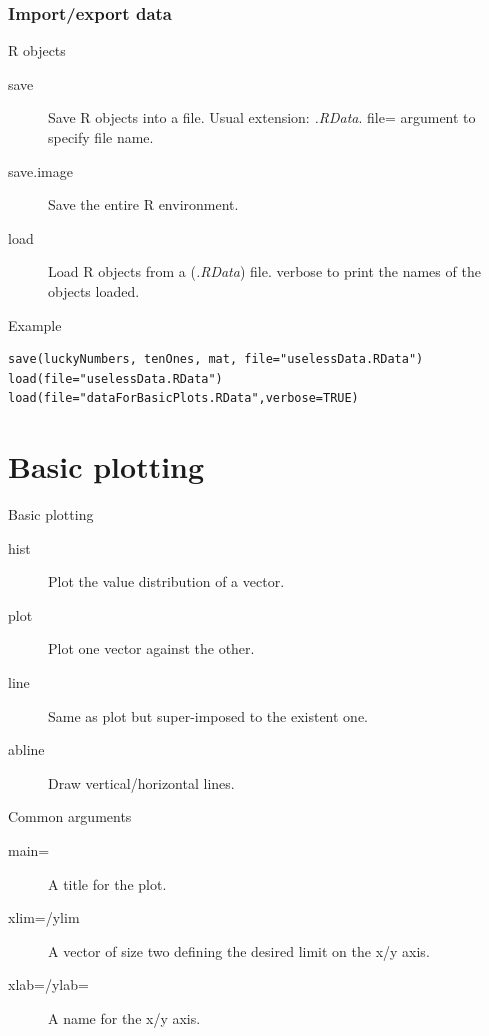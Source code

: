 \documentclass[10pt]{beamer}
\newenvironment{xframe}[2][]
  {\begin{frame}[fragile,environment=xframe,#1]
  \frametitle{#2}}
  {\end{frame}}
\begin{document}
\begin{xframe}{Import/export data}
  \begin{block}{R objects}
    \begin{description}
      \item[save] Save R objects into a file. Usual extension: {\it .RData}. {\sf file=} argument to specify file name.
      \item[save.image] Save the entire R environment.
      \item[load] Load R objects from a ({\it .RData}) file. {\sf verbose} to print the names of the objects loaded.
    \end{description}
  \end{block}
  \begin{exampleblock}{Example}
\begin{verbatim}
save(luckyNumbers, tenOnes, mat, file="uselessData.RData")
load(file="uselessData.RData")
load(file="dataForBasicPlots.RData",verbose=TRUE)
\end{verbatim}  
  \end{exampleblock}
\end{xframe}

\section{Basic plotting}

\begin{frame}{Basic plotting}
  \begin{block}{}
    \begin{description}
      \item[hist] Plot the value distribution of a vector.
      \item[plot] Plot one vector against the other.
      \item[line] Same as plot but super-imposed to the existent one.
      \item[abline] Draw vertical/horizontal lines.
    \end{description}
  \end{block}
  \begin{block}{Common arguments}
    \begin{description}
      \item[main=] A title for the plot.
      \item[xlim=/ylim] A vector of size two defining the desired limit on the x/y axis.
      \item[xlab=/ylab=] A name for the x/y axis.
    \end{description}
  \end{block}
\end{frame}
\end{document}
